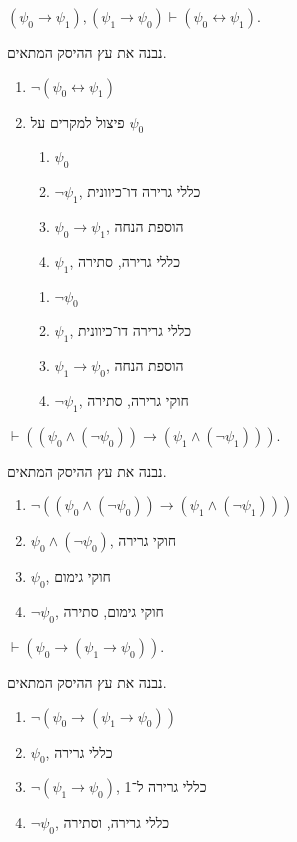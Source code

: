 \subquestion{}
$(\psi_0 \to \psi_1), (\psi_1 \to \psi_0) \vdash (\psi_0 \leftrightarrow \psi_1)$.
\begin{solution}
	נבנה את עץ ההיסק המתאים.
	\begin{enumerate}
		\item $\lnot (\psi_0 \leftrightarrow \psi_1)$
		\item פיצול למקרים על $\psi_0$
			\begin{enumerate}
				\item $\psi_0$
				\item $\lnot \psi_1$, כללי גרירה דו־כיוונית
				\item $\psi_0 \to \psi_1$, הוספת הנחה
				\item $\psi_1$, כללי גרירה, סתירה
			\end{enumerate}
			\begin{enumerate}
				\item $\lnot \psi_0$
				\item $\psi_1$, כללי גרירה דו־כיוונית
				\item $\psi_1 \to \psi_0$, הוספת הנחה
				\item $\lnot \psi_1$, חוקי גרירה, סתירה
			\end{enumerate}
	\end{enumerate}
\end{solution}

\subquestion{}
$\vdash ((\psi_0 \land (\lnot \psi_0)) \to (\psi_1 \land (\lnot \psi_1)))$.
\begin{solution}
	נבנה את עץ ההיסק המתאים.
	\begin{enumerate}
		\item $\lnot ((\psi_0 \land (\lnot \psi_0)) \to (\psi_1 \land (\lnot \psi_1)))$
		\item $\psi_0 \land (\lnot \psi_0)$, חוקי גרירה
		\item $\psi_0$, חוקי גימום
		\item $\lnot \psi_0$, חוקי גימום, סתירה
	\end{enumerate}
\end{solution}

\subquestion{}
$\vdash (\psi_0 \to (\psi_1 \to \psi_0))$.
\begin{solution}
	נבנה את עץ ההיסק המתאים.
	\begin{enumerate}
		\item $\lnot (\psi_0 \to (\psi_1 \to \psi_0))$
		\item $\psi_0$, כללי גרירה
		\item $\lnot (\psi_1 \to \psi_0)$, כללי גרירה ל־1
		\item $\lnot \psi_0$, כללי גרירה, וסתירה
	\end{enumerate}
\end{solution}

